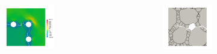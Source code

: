 \begin{frame}
\begin{columns}[T]
\begin{column}{0.2\textwidth}
\begin{figure}
\begin{subfigure}{0.94\linewidth}
        \end{subfigure}
        \begin{subfigure}{0.94\linewidth}
          \centering
          \includegraphics[width=0.9\linewidth,scale=0.3]{Chapter345/figures/three_bubbles_stress}
        \end{subfigure}
      \end{figure}
    \end{column}
    \begin{column}{0.4\textwidth}
      \vspace{-1em}
      \begin{figure}
        \centering
        \begin{subfigure}[t]{0.47\linewidth}
          \centering
          \includegraphics[width=0.9\linewidth,scale=0.3]{Chapter345/figures/partial_hbs_1}

\end{subfigure}
\end{figure}
\end{column}
\end{columns}
\end{frame}
